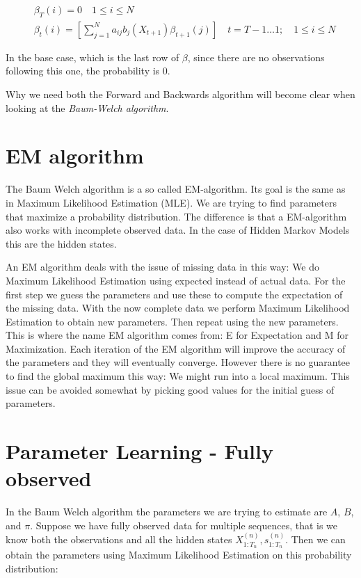 \begin{equation}
\begin{aligned}
   &\beta_{T}(i)=0 \quad 1 \leq i \leq N  \\
   &\beta_{t}(i)=\left[\sum_{j=1}^{N} a_{i j} b_{j}\left(X_{t+1}\right) \beta_{t+1}(j)\right] \quad t=T-1 \ldots 1 ; \quad 1 \leq i \leq N
   \label{eq:beta-def}
\end{aligned}
\end{equation}

In the base case, which is the last row of $\beta$, since there are no observations following this one, the probability is 0. \parencite{huang2001spoken}

Why we need both the Forward and Backwards algorithm will become clear when looking at the \emph{Baum-Welch algorithm}.

\section{EM algorithm}

The Baum Welch algorithm is a so called EM-algorithm. Its goal is the same as in Maximum Likelihood Estimation (MLE). We are trying to find parameters that maximize a probability distribution. The difference is that a EM-algorithm also works with incomplete observed data. In the case of Hidden Markov Models this are the hidden states. 

An EM algorithm deals with the issue of missing data in this way: We do Maximum Likelihood Estimation using expected instead of actual data. For the first step we guess the parameters and use these to compute the expectation of the missing data. With the now complete data we perform Maximum Likelihood Estimation to obtain new parameters. Then repeat using the new parameters. This is where the name EM algorithm comes from: E for Expectation and M for Maximization. Each iteration of the EM algorithm will improve the accuracy of the parameters and they will eventually converge. However there is no guarantee to find the global maximum this way: We might run into a local maximum. This issue can be avoided somewhat by picking good values for the initial guess of parameters. 

\section{Parameter Learning - Fully observed}

In the Baum Welch algorithm the parameters we are trying to estimate are $A$, $B$, and $\pi$. Suppose we have fully observed data for multiple sequences, that is we know both the observations and all the hidden states $X_{1: T_{n}}^{(n)}, s_{1: T_{n}}^{(n)}$. Then we can obtain the parameters using Maximum Likelihood Estimation on this probability distribution:


